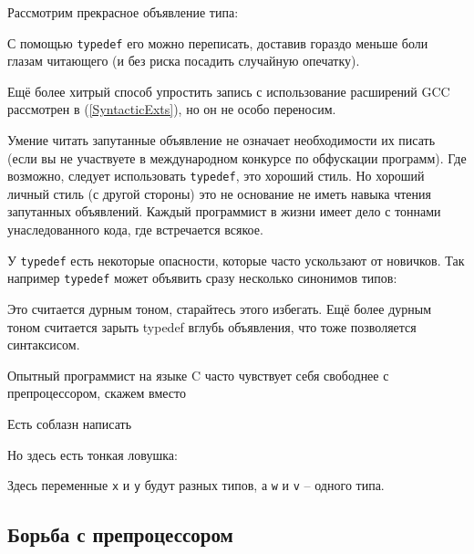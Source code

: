 \documentclass[a4paper,12pt,oneside]{article}
\begin{document}
Рассмотрим прекрасное объявление типа:



С помощью \lstinline!typedef! его можно переписать, доставив гораздо меньше боли глазам читающего (и без риска посадить случайную опечатку).



Ещё более хитрый способ упростить запись с использование расширений GCC рассмотрен в (\ref{SyntacticExts}), но он не особо переносим.

Умение читать запутанные объявление не означает необходимости их писать (если вы не участвуете в международном конкурсе по обфускации программ). Где возможно, следует использовать \lstinline!typedef!, это хороший стиль. Но хороший личный стиль (с другой стороны) это не основание не иметь навыка чтения запутанных объявлений. Каждый программист в жизни имеет дело с тоннами унаследованного кода, где встречается всякое.

У \lstinline!typedef! есть некоторые опасности, которые часто ускользают от новичков. Так например \lstinline!typedef! может объявить сразу несколько синонимов типов:



Это считается дурным тоном, старайтесь этого избегать. Ещё более дурным тоном считается зарыть typedef вглубь объявления, что тоже позволяется синтаксисом.



Опытный программист на языке C часто чувствует себя свободнее с препроцессором, скажем вместо



Есть соблазн написать



Но здесь есть тонкая ловушка:



Здесь переменные \lstinline!x! и \lstinline!y! будут разных типов, а \lstinline!w! и \lstinline!v! – одного типа.

\pagebreak
\subsection{Борьба с препроцессором}
\end{document}
